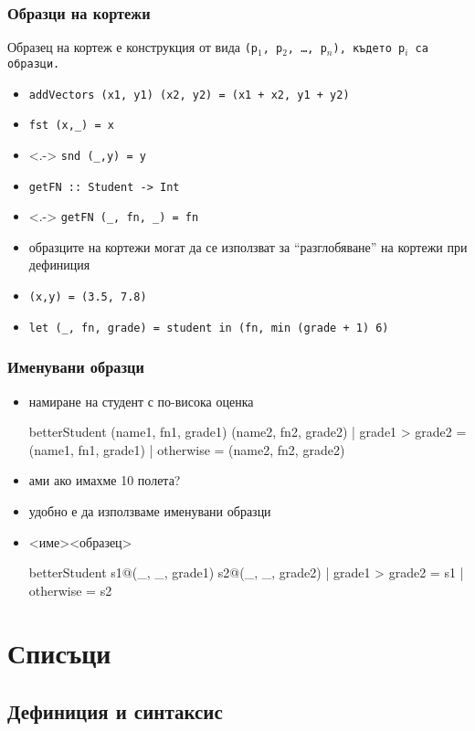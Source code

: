 \documentclass{beamer}
\begin{document}
\begin{frame}[fragile]
  \frametitle{Образци на кортежи}
  Образец на кортеж е конструкция от вида \tt{(p$_1$, p$_2$, \ldots, p$_n$)}, където \tt{p$_i$} са образци.
  \begin{itemize}[<+->]
  \item \verb#addVectors (x1, y1) (x2, y2) = (x1 + x2, y1 + y2)#
  \item \verb#fst (x,_) = x#
  \item<.-> \verb#snd (_,y) = y#
  \item \verb#getFN :: Student -> Int#
  \item<.-> \verb#getFN (_, fn, _) = fn#
  \item образците на кортежи могат да се използват за ``разглобяване'' на кортежи при дефиниция
  \item \verb#(x,y) = (3.5, 7.8)#
  \item \verb#let (_, fn, grade) = student in (fn, min (grade + 1) 6)#
  \end{itemize}
\end{frame}

\begin{frame}[fragile]
  \frametitle{Именувани образци}
  \begin{itemize}[<+->]
  \item намиране на студент с по-висока оценка
\begin{semiverbatim}
betterStudent (name1, fn1, grade1) (name2, fn2, grade2)
 | grade1 > grade2 = (name1, fn1, grade1)
 | otherwise       = (name2, fn2, grade2)
\end{semiverbatim}
  \item ами ако имахме 10 полета?
  \item удобно е да използваме \alert{именувани образци}
  \item{} <име>\tta@<образец> \onslide<+->
\begin{semiverbatim}
betterStudent s1@(_, _, grade1) s2@(_, _, grade2)
 | grade1 > grade2 = s1
 | otherwise       = s2
\end{semiverbatim}
  \end{itemize}
\end{frame}

\section{Списъци}

\subsection{Дефиниция и синтаксис}
\end{document}
